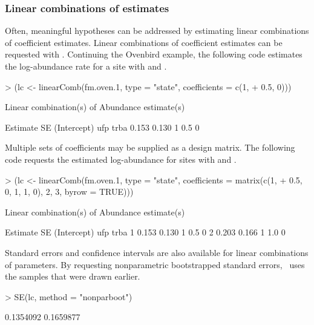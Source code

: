\documentclass[article,shortnames]{jss}
\newcommand{\um}{\pkg{unmarked}}
\begin{document}
{\subsubsection{Linear combinations of estimates}

Often, meaningful hypotheses can be addressed by estimating linear
combinations of coefficient estimates.  Linear combinations of coefficient
estimates can be requested with . Continuing the Ovenbird 
example, the following code estimates the log-abundance rate for a site with 
 and .

\begin{Schunk}
\begin{Sinput}
> (lc <- linearComb(fm.oven.1, type = "state", coefficients = c(1, 
+     0.5, 0)))
\end{Sinput}
\begin{Soutput}
Linear combination(s) of Abundance estimate(s)

 Estimate    SE (Intercept) ufp trba
    0.153 0.130           1 0.5    0
\end{Soutput}
\end{Schunk}

Multiple sets of coefficients may be supplied as a design matrix.  The
following code requests the estimated log-abundance for sites with
 and . 

\begin{Schunk}
\begin{Sinput}
> (lc <- linearComb(fm.oven.1, type = "state", coefficients = matrix(c(1, 
+     0.5, 0, 1, 1, 0), 2, 3, byrow = TRUE)))
\end{Sinput}
\begin{Soutput}
Linear combination(s) of Abundance estimate(s)

  Estimate    SE (Intercept) ufp trba
1    0.153 0.130           1 0.5    0
2    0.203 0.166           1 1.0    0
\end{Soutput}
\end{Schunk}

Standard errors and confidence intervals are also available for linear
combinations of parameters.  By requesting nonparametric bootstrapped
standard errors, \um\ uses the samples that were drawn earlier.

\begin{Schunk}
\begin{Sinput}
> SE(lc, method = "nonparboot")
\end{Sinput}
\begin{Soutput}
[1] 0.1354092 0.1659877
\end{Soutput}
\end{Schunk}

}
\end{document}
